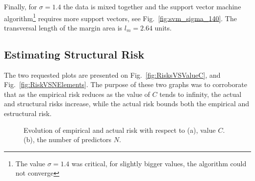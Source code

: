\documentclass[letterpaper, 10 pt, conference]{ieeeconf}  %
\begin{document}
Finally, for $\sigma = 1.4$ the data is mixed together and the support vector machine algorithm\footnote{The value $\sigma = 1.4$ was critical, for slightly bigger values, the algorithm could not converge}  requires more support vectors, see Fig.~\ref{fig:svm_sigma_140}. The transversal length of the margin area is $l_{m} = 2.64$ units.

\subsection{Estimating Structural Risk}
\label{sec:ExperimentEstimatingStructuralRisk}

The two requested plots are presented on Fig.~\ref{fig:RisksVSValueC}, and Fig.~\ref{fig:RiskVSNElements}. The purpose
of these two graphs was to corroborate that as the empirical risk reduces as the value of $C$ tends to infinity, the actual and structural risks
increase, while the actual risk bounds both the empirical and estructural risk.

\begin{figure}[ht!]
 \begin{center}
         \caption{Evolution of empirical and actual risk with respect to (a), value $C$. (b), the number of predictors $N$.}
 \end{center}
\end{figure}
\end{document}
